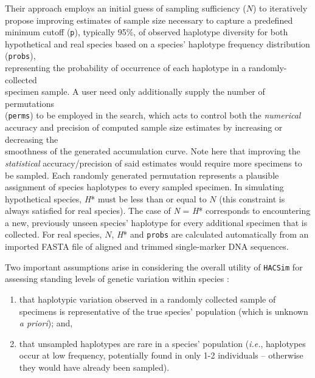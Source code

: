 Their approach employs an initial guess of sampling sufficiency ($N$) to iteratively propose improving estimates of sample size necessary to capture a predefined minimum cutoff ({\tt p}), typically 95\%, of observed haplotype diversity for both hypothetical and real species based on a species' haplotype frequency distribution ({\tt probs}), \\ representing the probability of occurrence of each haplotype in a randomly-collected \\ specimen sample. A user need only additionally supply the number of permutations \\ ({\tt perms}) to be employed in the search, which acts to control both the \textit{numerical} accuracy and precision of computed sample size estimates by increasing or decreasing the \\ smoothness of the generated accumulation curve. Note here that improving the \textit{statistical} accuracy/precision of said estimates would require more specimens to be sampled.  Each randomly generated permutation represents a plausible assignment of species haplotypes to every sampled specimen. In simulating hypothetical species, \textit{H}* must be less than or equal to $N$ (this constraint is always satisfied for real species). The case of \textit{N} = \textit{H}*  corresponds to encountering a new, previously unseen species' haplotype for every additional specimen that is collected. For real species, $N$, \textit{H}* and {\tt probs} are calculated automatically from an imported FASTA file of aligned and trimmed single-marker DNA sequences.

Two important assumptions arise in considering the overall utility of {\tt HACSim} for assessing standing levels of genetic variation within species \cite{phillips2020hacsim}: 

\begin{enumerate}
\item that haplotypic variation observed in a randomly collected sample of specimens is representative of the true species' population (which is unknown \textit{a priori}); and,

\item that unsampled haplotypes are rare in a species' population (\textit{i.e.}, haplotypes occur at low frequency, potentially found in only 1-2 individuals -- otherwise they would have already been sampled).
\end{enumerate}

